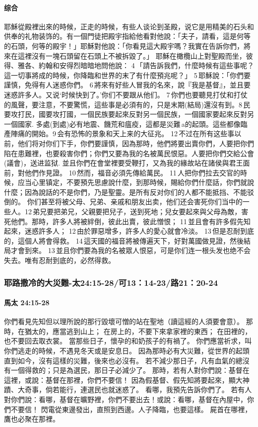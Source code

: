 \paragraph{综合}
耶穌從殿裡出來的時候，正走的時候，有些人谈论到圣殿，说它是用精美的石头和供奉的礼物装饰的。有一個門徒把殿宇指給他看對他說：「夫子，請看，這是何等的石頭，何等的殿宇！」耶穌對他說：「你看見這大殿宇嗎？我實在告訴你們，將來在這裡沒有一塊石頭留在石頭上不被拆毀了。」
耶穌在橄欖山上對聖殿而坐，彼得、雅各、約翰和安得烈暗暗地問他說： 4 「請告訴我們，什麼時候有這些事呢？這一切事將成的時候，你降臨和世界的末了有什麼預兆呢？」 5 耶穌說：「你們要謹慎，免得有人迷惑你們。 6 將來有好些人冒我的名來，說『我是基督』，並且要迷惑許多人。又说‘时候快到了。’你们不要跟从他们。 7 你們也要聽見打仗和打仗的風聲，要注意，不要驚慌，這些事是必須有的，只是末期(結局)還沒有到。8 民要攻打民，國要攻打國，一個民族要起來反對另一個民族，一個國家要起來反對另一個國家. 多處(到處)必有地震、饑荒和瘟疫，這都是災難 a的起頭。這些都像臨產陣痛的開始。9 会有恐怖的景象和天上来的大征兆。 12 不过在所有这些事以前，他们将对你们下手，你們要謹慎，因為那時，他們將要出賣你們，人要把你們陷在患難裡，也要殺害你們；你們又要為我的名被萬民恨惡。人要把你們交給公會(議會)，送进监狱. 並且你們在會堂裡要受鞭打，又為我的緣故站在諸侯與君王面前，對他們作見證。 10 然而，福音必須先傳給萬民。 11 人把你們拉去交官的時候，应当心里镇定，不要預先思慮說什麼，到那時候，賜給你們什麼話，你們就說什麼；因為說話的不是你們，乃是聖靈。是所有反对你们的人都不能抵挡、不能驳倒的。 你们甚至将被父母、兄弟、亲戚和朋友出卖，他们还会害死你们当中的一些人。12 弟兄要把弟兄，父親要把兒子，送到死地；兒女要起來與父母為敵，害死他們。那時，許多人將被絆倒，彼此出賣，彼此憎恨； 11 並且會有許多假先知起來，迷惑許多人； 12 由於罪惡增多，許多人的愛心就會冷淡。 13 但是忍耐到底的，這個人將會得救。 14 這天國的福音將被傳遍天下，好對萬國做見證，然後結局才會到來。 13 並且你們要為我的名被眾人恨惡，可是你们连一根头发也绝不会失去。唯有忍耐到底的，必然得救。


\subsubsection{耶路撒冷的大災難-太24:15-28/可13：14-23/路21：20-24}
\paragraph{馬太 24:15-28}
你們看見先知但以理所說的那行毀壞可憎的站在聖地（讀這經的人須要會意）。
那時，在猶太的，應當逃到山上；
在房上的，不要下來拿家裡的東西；
在田裡的，也不要回去取衣裳。
當那些日子，懷孕的和奶孩子的有禍了。
你們應當祈求，叫你們逃走的時候，不遇見冬天或是安息日。
因為那時必有大災難，從世界的起頭直到如今，沒有這樣的災難，後來也必沒有。
若不減少那日子，凡有血氣的總沒有一個得救的；只是為選民，那日子必減少了。
那時，若有人對你們說：基督在這裡，或說：基督在那裡，你們不要信！
因為假基督、假先知將要起來，顯大神蹟、大奇事，倘若能行，連選民也就迷惑了。
看哪，我預先告訴你們了。
若有人對你們說：看哪，基督在曠野裡，你們不要出去！或說：看哪，基督在內屋中，你們不要信！
閃電從東邊發出，直照到西邊。人子降臨，也要這樣。
屍首在哪裡，鷹也必聚在那裡。

